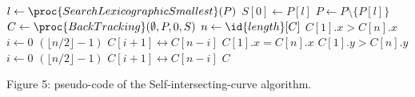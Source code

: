 \documentclass[a4paper,twoside,10pt]{article}
\begin{document}
\thispagestyle{empty}
\begin{codebox}
\li $l \gets \proc{SearchLexicographicSmallest}(P)$
\li $S[0] \gets P[l]$
\li $P \gets P \setminus \{P[l]\}$
\li $C \gets \proc{BackTracking}(\emptyset, P, 0, S)$
\li $n \gets \id{length}[C]$
\li \If     $C[1].x > C[n].x$
\li \Then   \For    $i \gets 0$ \To $(\lfloor n/2 \rfloor - 1)$
\li         \Do     $C[i+1] \leftrightarrow C[n-i]$
            \End
\li \Else   \If     $C[1].x = C[n].x$
\li         \Then   \If     $C[1].y > C[n].y$
\li                 \Then   \For    $i \gets 0$ \To $(\lfloor n/2 \rfloor - 1)$
\li                         \Do     $C[i+1] \leftrightarrow C[n-i]$
                            \End
                    \End
            \End
    \End
\li \Return $C$
\end{codebox}

Figure 5: pseudo-code of the Self-intersecting-curve algorithm.
\end{document}

